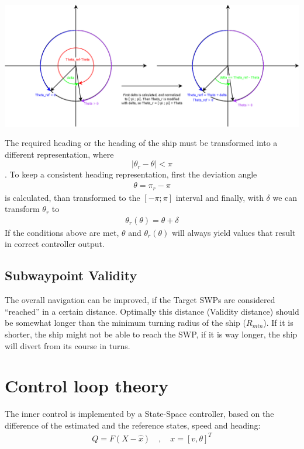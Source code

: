\includegraphics[width=\textwidth]{img/ControlStrategyFigures/Headings.png}

The required heading or the heading of the ship must be transformed into a different representation, where $$|\theta_{r}-\theta| < \pi$$. To keep a consistent heading representation, first the deviation angle 
\begin{align}
\theta = \pi_{r}-\pi
\end{align} is calculated, than transformed to the $[-\pi;\pi]$ interval and finally, with $\delta$ we can transform $\theta_{r}$ to 
\begin{align}
\theta_{r}(\theta) = \theta + \delta
\end{align}
If the conditions above are met, $\theta$ and $\theta_r(\theta)$ will always yield values that result in correct controller output.

\subsection{Subwaypoint Validity}

The overall navigation can be improved, if the Target SWPs are considered ``reached'' in a certain distance. Optimally this distance (Validity distance) should be somewhat longer than the minimum turning radius of the ship ($R_{min}$). If it is shorter, the ship might not be able to reach the SWP, if it is way longer, the ship will divert from its course in turns.

\section{Control loop theory}

The inner control is implemented by a State-Space controller, based on the difference of the estimated and the reference states, speed and heading:
\begin{align}
Q = F(X-\hat{x}) \quad , \quad x = [v, \theta]^T
\end{align}

